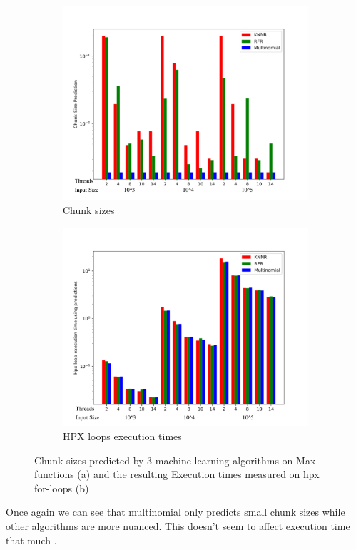 \begin{figure}[h]
	\centering
	\begin{subfigure}[b]{0.5\textwidth}
		\centering
		\includegraphics[width=\textwidth]{images/bars_max_cs.pdf}
		\caption[Network2]%
		{{Chunk sizes}}    
	\end{subfigure}
	\hfill
	\begin{subfigure}[b]{0.49\textwidth}  
		\centering 
		\includegraphics[width=\textwidth]{images/bars_max_times.pdf}
		\caption[]%
		{{HPX loops execution times}}    
	\end{subfigure}
	\caption{Chunk sizes predicted by 3 machine-learning algorithms on Max functions (a) and the resulting Execution times measured on hpx for-loops (b)} 
\end{figure}
Once again we can see that multinomial only predicts small chunk sizes while other algorithms are more nuanced. This doesn't seem to affect execution time that much .
\newpage
